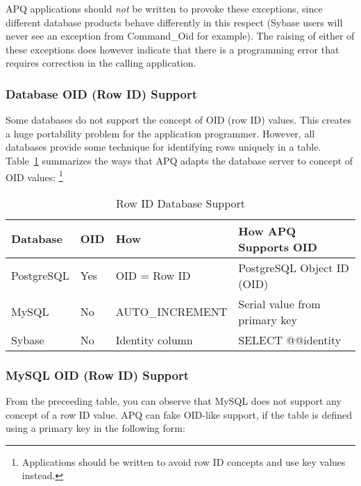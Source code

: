 \documentclass[english,letterpaper]{book}
\begin{document}
APQ applications should \emph{not} be written to provoke these exceptions,
since different database products behave differently in this respect
(Sybase users will never see an exception from Command\_Oid for example).
The raising of either of these exceptions does however indicate that
there is a programming error that requires correction in the calling
application.


\subsubsection{Database OID (Row ID) Support}

Some databases do not support the concept of OID (row ID) values.
This creates a huge portability problem for the application programmer.
However, all databases provide some technique for identifying rows
uniquely in a table. Table~\ref{t:roids} summarizes the ways that
APQ adapts the database server to concept of OID values:%
\footnote{Applications should be written to avoid row ID concepts and use key values instead.}

\begin{table}
   \begin{center}
      \begin{tabular}{|l|l|l|l|}
         \hline 
         Database          &  OID      &  How               &  How APQ Supports OID\\
         \hline
         PostgreSQL        & Yes       &  OID = Row ID      &  PostgreSQL Object ID (OID)\\
         MySQL             & No        &  AUTO\_INCREMENT   &  Serial value from primary key\\
         Sybase            & No        &  Identity column   &  SELECT @@identity\\
         \hline
      \end{tabular}
   \end{center}
   \caption{Row ID Database Support}\label{t:roids}
\end{table}


\subsubsection{MySQL OID (Row ID) Support}

From the preceeding table, you can observe that MySQL does not support
any concept of a row ID value. APQ can fake OID-like support, if the
table is defined using a primary key in the following form:
\end{document}
